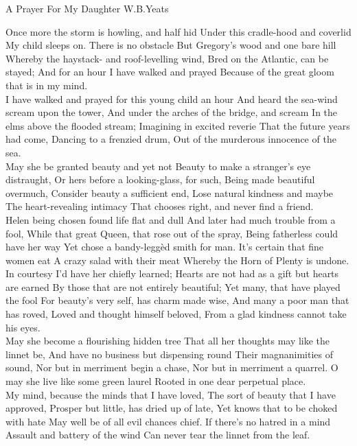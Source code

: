 \begin{poem}
 {A Prayer For My Daughter}
 {W.B.Yeats}

 Once more the storm is howling, and half hid
 Under this cradle-hood and coverlid
 My child sleeps on. There is no obstacle
 But Gregory's wood and one bare hill
 Whereby the haystack- and roof-levelling wind,
 Bred on the Atlantic, can be stayed;
 And for an hour I have walked and prayed
 Because of the great gloom that is in my mind.\\

 I have walked and prayed for this young child an hour
 And heard the sea-wind scream upon the tower,
 And under the arches of the bridge, and scream
 In the elms above the flooded stream;
 Imagining in excited reverie
 That the future years had come,
 Dancing to a frenzied drum,
 Out of the murderous innocence of the sea.\\

 May she be granted beauty and yet not
 Beauty to make a stranger's eye distraught,
 Or hers before a looking-glass, for such,
 Being made beautiful overmuch,
 Consider beauty a sufficient end,
 Lose natural kindness and maybe
 The heart-revealing intimacy
 That chooses right, and never find a friend.\\

 Helen being chosen found life flat and dull
 And later had much trouble from a fool,
 While that great Queen, that rose out of the spray,
 Being fatherless could have her way
 Yet chose a bandy-legg\`{e}d smith for man.
 It's certain that fine women eat
 A crazy salad with their meat
 Whereby the Horn of Plenty is undone.\\

 In courtesy I'd have her chiefly learned;
 Hearts are not had as a gift but hearts are earned
 By those that are not entirely beautiful;
 Yet many, that have played the fool
 For beauty's very self, has charm made wise,
 And many a poor man that has roved,
 Loved and thought himself beloved,
 From a glad kindness cannot take his eyes.\\

 May she become a flourishing hidden tree
 That all her thoughts may like the linnet be,
 And have no business but dispensing round
 Their magnanimities of sound,
 Nor but in merriment begin a chase,
 Nor but in merriment a quarrel.
 O may she live like some green laurel
 Rooted in one dear perpetual place.\\

 My mind, because the minds that I have loved,
 The sort of beauty that I have approved,
 Prosper but little, has dried up of late,
 Yet knows that to be choked with hate
 May well be of all evil chances chief.
 If there's no hatred in a mind
 Assault and battery of the wind
 Can never tear the linnet from the leaf.\\


\end{poem}
